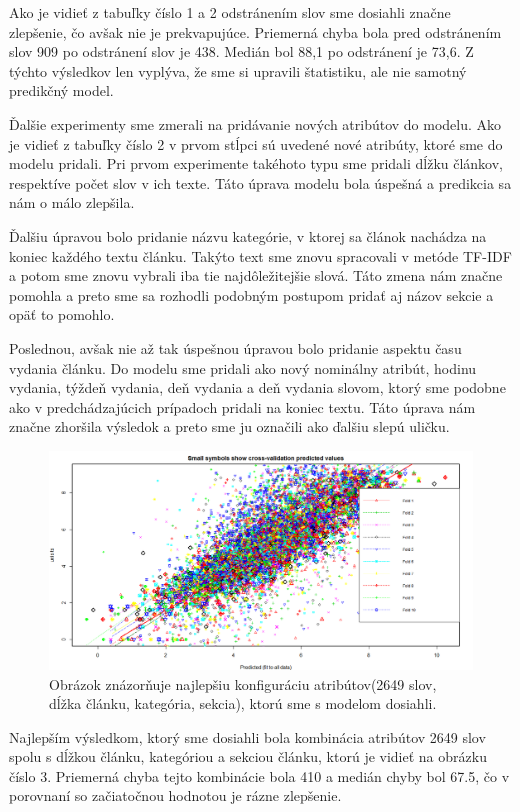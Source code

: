 \documentclass[runningheads,a4paper]{llncs}
\begin{document}
Ako je vidieť z tabuľky číslo 1 a 2 odstránením slov sme dosiahli značne zlepšenie, čo avšak nie je prekvapujúce. Priemerná chyba bola pred odstránením slov 909 po odstránení slov je 438. Medián bol 88,1 po odstránení je 73,6. Z týchto výsledkov len vyplýva, že sme si upravili štatistiku, ale nie samotný predikčný model.
  
Ďalšie experimenty sme zmerali na pridávanie nových atribútov do modelu. Ako je vidieť z tabuľky číslo 2 v prvom stĺpci sú uvedené nové atribúty, ktoré sme do modelu pridali. Pri prvom experimente takéhoto typu sme pridali dĺžku článkov, respektíve počet slov v ich texte. Táto úprava modelu bola úspešná a predikcia sa nám o málo zlepšila.

Ďalšiu úpravou bolo pridanie názvu kategórie, v ktorej sa článok nachádza na koniec každého textu článku. Takýto text sme znovu spracovali v metóde TF-IDF a potom sme znovu vybrali iba tie najdôležitejšie slová. Táto zmena nám značne pomohla a preto sme sa rozhodli podobným postupom pridať aj názov sekcie a opäť to pomohlo.

Poslednou, avšak nie až tak úspešnou úpravou bolo pridanie aspektu času vydania článku. Do modelu sme pridali ako nový nominálny atribút, hodinu vydania, týždeň vydania, deň vydania a deň vydania slovom, ktorý sme podobne ako v predchádzajúcich prípadoch pridali na koniec textu. Táto úprava nám značne zhoršila výsledok a preto sme ju označili ako ďalšiu slepú uličku.

\begin{figure}[h!]
  \centering  
      \includegraphics[width=1.0\textwidth]{plot11.png}
  \caption{Obrázok znázorňuje najlepšiu konfiguráciu atribútov(2649 slov, dĺžka článku, kategória, sekcia), ktorú sme s modelom dosiahli. }  
\end{figure} 

Najlepším výsledkom, ktorý sme dosiahli bola kombinácia atribútov 2649 slov spolu s dĺžkou článku, kategóriou a sekciou článku, ktorú je vidieť na obrázku číslo 3. Priemerná chyba tejto kombinácie bola 410 a medián chyby bol 67.5, čo v porovnaní so začiatočnou hodnotou je rázne zlepšenie.
\end{document}
